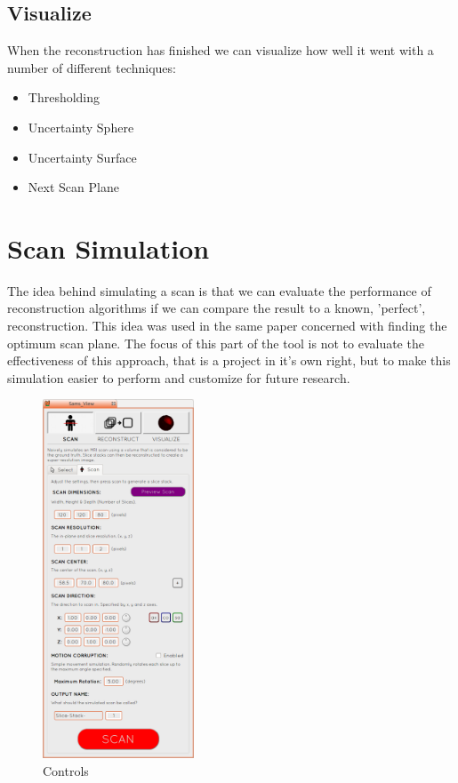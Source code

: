 \subsection*{Visualize}
When the reconstruction has finished we can visualize how well it went with a number of different techniques:

\begin{itemize}
  \item Thresholding
  \item Uncertainty Sphere
  \item Uncertainty Surface
  \item Next Scan Plane
\end{itemize}

\newpage
\section{Scan Simulation}\label{section:simulatescan}
The idea behind simulating a scan is that we can evaluate the performance of reconstruction algorithms if we can compare the result to a known, 'perfect', reconstruction. This idea was used in the same paper concerned with finding the optimum scan plane\cite{uncertaintysvd}. The focus of this part of the tool is not to evaluate the effectiveness of this approach, that is a project in it's own right, but to make this simulation easier to perform and customize for future research.

\begin{figure}
  \vspace{-20pt}
  \includegraphics[width=0.4\textwidth]{images/scan_simulation/scan_settings.png}
  \caption{Controls}\label{fig:scansettings}
\end{figure}

